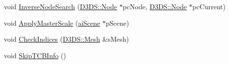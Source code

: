 \begin{DoxyCompactItemize}
\item 
void \hyperlink{class_assimp_1_1_discreet3_d_s_importer_ad327257d0e1abb7e18fbc0d094f16455}{Inverse\+Node\+Search} (\hyperlink{struct_assimp_1_1_d3_d_s_1_1_node}{D3\+D\+S\+::\+Node} $\ast$pc\+Node, \hyperlink{struct_assimp_1_1_d3_d_s_1_1_node}{D3\+D\+S\+::\+Node} $\ast$pc\+Current)
\item 
void \hyperlink{class_assimp_1_1_discreet3_d_s_importer_afe28966a46a8281129c5cbd87847aad2}{Apply\+Master\+Scale} (\hyperlink{structai_scene}{ai\+Scene} $\ast$p\+Scene)
\item 
void \hyperlink{class_assimp_1_1_discreet3_d_s_importer_aa5e1b3aec4782d0114be8cbc4097ab2a}{Check\+Indices} (\hyperlink{struct_assimp_1_1_d3_d_s_1_1_mesh}{D3\+D\+S\+::\+Mesh} \&s\+Mesh)
\item 
void \hyperlink{class_assimp_1_1_discreet3_d_s_importer_a005fff2dc71c6befc7ada7397c058266}{Skip\+T\+C\+B\+Info} ()
\end{DoxyCompactItemize}
